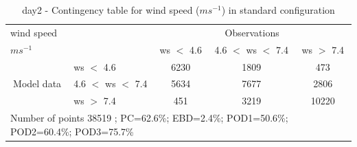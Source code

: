 \begin{table}[h!]
\begin{center}
\begin{tabular}{llccc}
\hline
{wind speed}                                       &                                                    & \multicolumn{3}{c}{Observations}                 \\
{$m s^{-1}$}                                       &                             & ws $<$ 4.6   & 4.6 $<$ ws $<$ 7.4 & ws $>$ 7.4 \\
\hline
\multicolumn{1}{c}{\multirow{3}{*}{Model data}}  & ws $<$ 4.6             & 6230                & 1809                       & 473              \\
                                                 & 4.6  $<$ ws $<$ 7.4 & 5634                & 7677                       & 2806              \\
                                                 & ws $>$ 7.4             & 451                & 3219                       & 10220              \\
\hline 
\multicolumn{5}{l}{ Number of points        38519 ; PC=62.6\%; EBD=2.4\%; POD1=50.6\%; POD2=60.4\%; POD3=75.7\%}                 \\
\end{tabular}
\end{center}
\caption{day2 - Contingency table for {wind speed} ($m s^{-1}$) in standard configuration}
\label{tab:contingencywsBEF:day2}
\end{table}
